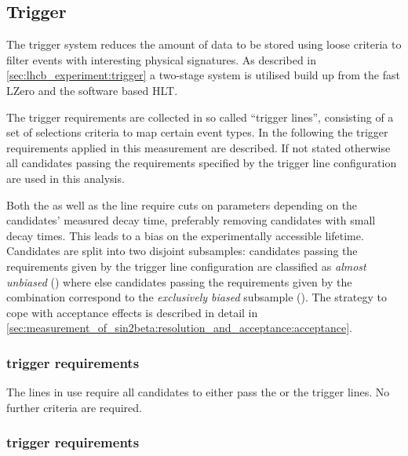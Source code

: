 \subsection{Trigger}
\label{sec:measurement_of_sin2beta:data_preparation:trigger}

The \LHCb trigger system reduces the amount of data to be stored using loose
criteria to filter events with interesting physical signatures. As described in
\cref{sec:lhcb_experiment:trigger} a two-stage system is utilised build up from
the fast \acf{LZero} and the software based \acf{HLT}.

The trigger requirements are collected in so called \enquote{trigger lines},
consisting of a set of selections criteria to map certain event types. In the
following the trigger requirements applied in this measurement are described. If
not stated otherwise all candidates passing the requirements specified by the
trigger line configuration \TriggerReq are used in this analysis.

Both the \HLTOneTrackMuon as well as the \HLTTwoDiMuonDetachedJpsi line require
cuts on parameters depending on the candidates' measured decay time, preferably
removing candidates with small decay times. This leads to a bias on the
experimentally accessible lifetime. Candidates are split into two disjoint
subsamples: candidates passing the requirements given by the trigger line
configuration \TriggerReqAU are classified as \emph{almost unbiased}
(\textbf{\catAU}) where else candidates passing the requirements given by the
combination \TriggerReqEB correspond to the \emph{exclusively biased} subsample
(\textbf{\catEB}). The strategy to cope with acceptance effects is described in
detail in \cref{sec:measurement_of_sin2beta:resolution_and_acceptance:acceptance}.

\subsubsection{\LZero trigger requirements}
\label{sec:measurement_of_sin2beta:data_preparation:trigger:lzero}

The \HLT lines in use require all candidates to either pass the \LZeroMuon or
the \LZeroDiMuon trigger lines. No further \LZero criteria are required.

\subsubsection{\HLTOne trigger requirements}
\label{sec:measurement_of_sin2beta:data_preparation:trigger:hlt1}

